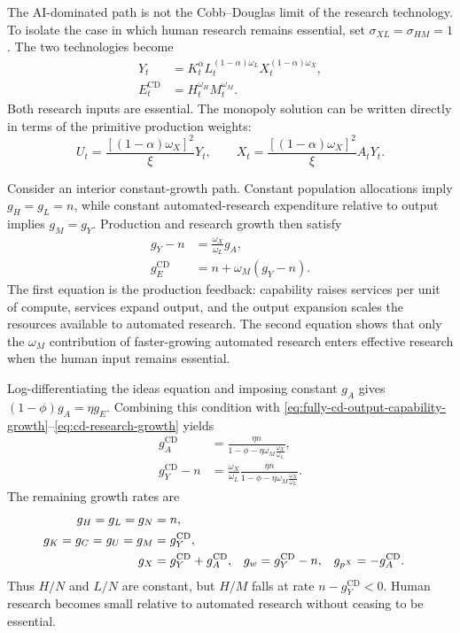 The AI-dominated path is not the Cobb--Douglas limit of the research technology.
To isolate the case in which human research remains essential, set
$\sigma_{XL}=\sigma_{HM}=1$. The two technologies become
\begin{align}
    Y_t
    &=K_t^\alpha L_t^{(1-\alpha)\omega_L}
        X_t^{(1-\alpha)\omega_X},
    \label{eq:fully-cd-production}\\
    E_t^{\mathrm{CD}}
    &=H_t^{\omega_H}M_t^{\omega_M}.
    \label{eq:cd-research-counterfactual}
\end{align}
Both research inputs are essential. The monopoly solution can be written directly
in terms of the primitive production weights:
\begin{equation}
    U_t
    =
    \frac{[(1-\alpha)\omega_X]^2}{\xi}Y_t,
    \qquad
    X_t
    =
    \frac{[(1-\alpha)\omega_X]^2}{\xi}A_tY_t.
    \label{eq:fully-cd-monopoly-primitives}
\end{equation}

Consider an interior constant-growth path. Constant population allocations imply
$g_H=g_L=n$, while constant automated-research expenditure relative to output implies
$g_M=g_Y$. Production and research growth then satisfy
\begin{align}
    g_Y-n
    &=
    \frac{\omega_X}{\omega_L}g_A,
    \label{eq:fully-cd-output-capability-growth}\\
    g_E^{\mathrm{CD}}
    &=
    n+\omega_M(g_Y-n).
    \label{eq:cd-research-growth}
\end{align}
The first equation is the production feedback: capability raises services per unit
of compute, services expand output, and the output expansion scales the resources
available to automated research. The second equation shows that only the
$\omega_M$ contribution of faster-growing automated research enters effective
research when the human input remains essential.

Log-differentiating the ideas equation and imposing constant $g_A$ gives
$(1-\phi)g_A=\eta g_E$. Combining this condition with
\eqref{eq:fully-cd-output-capability-growth}--\eqref{eq:cd-research-growth} yields
\begin{align}
    g_A^{\mathrm{CD}}
    &=
    \frac{\eta n}
    {1-\phi-\eta\omega_M\frac{\omega_X}{\omega_L}},
    \label{eq:full-cd-ga}\\
    g_Y^{\mathrm{CD}}-n
    &=
    \frac{\omega_X}{\omega_L}
    \frac{\eta n}
    {1-\phi-\eta\omega_M\frac{\omega_X}{\omega_L}}.
    \label{eq:full-cd-gamma}
\end{align}
The remaining growth rates are
\begin{align}
    g_H=g_L=g_N&=n,
    \notag\\
    g_K=g_C=g_U=g_M
    &=g_Y^{\mathrm{CD}},
    \notag\\
    g_X&=g_Y^{\mathrm{CD}}+g_A^{\mathrm{CD}},
    &
    g_w&=g_Y^{\mathrm{CD}}-n,
    &
    g_{p^X}&=-g_A^{\mathrm{CD}}.
    \label{eq:fully-cd-growth-rates}
\end{align}
Thus $H/N$ and $L/N$ are constant, but $H/M$ falls at rate
$n-g_Y^{\mathrm{CD}}<0$. Human research becomes small relative to automated research
without ceasing to be essential.


